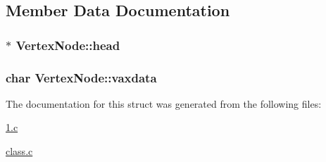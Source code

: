 \subsection{\-Member \-Data \-Documentation}
\hypertarget{struct_vertex_node_acaae45f5b86fb061c0356fcad1ec60fc}{
\subsubsection[{head}]{ $\ast$ {\bf \-Vertex\-Node\-::head}}}\label{struct_vertex_node_acaae45f5b86fb061c0356fcad1ec60fc}
\hypertarget{struct_vertex_node_aab75cbfa32f9a250283471ad09ab2396}{
\subsubsection[{vaxdata}]{\setlength{\rightskip}{0pt plus 5cm}char {\bf \-Vertex\-Node\-::vaxdata}}}\label{struct_vertex_node_aab75cbfa32f9a250283471ad09ab2396}


\-The documentation for this struct was generated from the following files\-:\begin{DoxyCompactItemize}
\item 
\hyperlink{1_8c}{1.\-c}\item 
\hyperlink{class_8c}{class.\-c}\end{DoxyCompactItemize}
